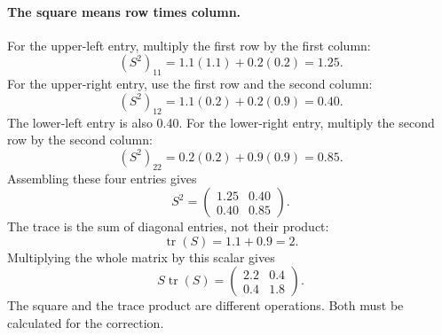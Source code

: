 \documentclass[11pt]{article}
\begin{document}
\paragraph{The square means row times column.}
For the upper-left entry, multiply the first row by the first column:
\begin{equation}
 (S^2)_{11}=1.1(1.1)+0.2(0.2)=1.25.
\end{equation}
For the upper-right entry, use the first row and the second column:
\begin{equation}
 (S^2)_{12}=1.1(0.2)+0.2(0.9)=0.40.
\end{equation}
The lower-left entry is also 0.40. For the lower-right entry, multiply
the second row by the second column:
\begin{equation}
 (S^2)_{22}=0.2(0.2)+0.9(0.9)=0.85.
\end{equation}
Assembling these four entries gives
\begin{equation}
 S^2=\begin{pmatrix}1.25&0.40\\0.40&0.85\end{pmatrix}.
\end{equation}
The trace is the sum of diagonal entries, not their product:
\begin{equation}
 \operatorname{tr}(S)=1.1+0.9=2.
\end{equation}
Multiplying the whole matrix by this scalar gives
\begin{equation}
 S\operatorname{tr}(S)=\begin{pmatrix}2.2&0.4\\0.4&1.8\end{pmatrix}.
\end{equation}
The square and the trace product are different operations. Both must be
calculated for the correction.
\end{document}
